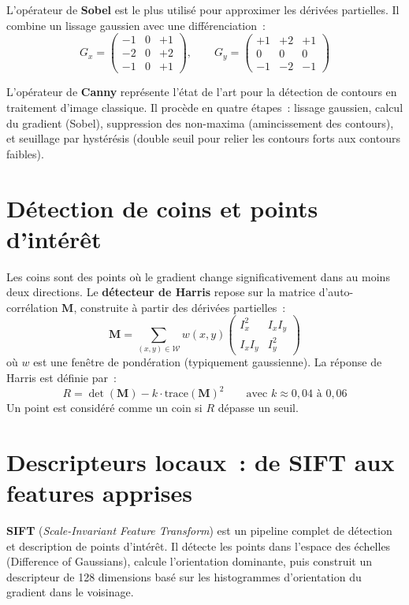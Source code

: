 \documentclass[a4paper,11pt,twoside]{book}
\newcommand{\mat}[1]{\mathbf{#1}}
\begin{document}
L'opérateur de \textbf{Sobel} est le plus utilisé pour approximer les dérivées partielles. Il combine un lissage gaussien avec une différenciation~:
\[
G_x = \begin{pmatrix} -1 & 0 & +1 \\ -2 & 0 & +2 \\ -1 & 0 & +1 \end{pmatrix}, \qquad
G_y = \begin{pmatrix} +1 & +2 & +1 \\ 0 & 0 & 0 \\ -1 & -2 & -1 \end{pmatrix}
\]

L'opérateur de \textbf{Canny} représente l'état de l'art pour la détection de contours en traitement d'image classique. Il procède en quatre étapes~: lissage gaussien, calcul du gradient (Sobel), suppression des non-maxima (amincissement des contours), et seuillage par hystérésis (double seuil pour relier les contours forts aux contours faibles).

\section{Détection de coins et points d'intérêt}

Les coins sont des points où le gradient change significativement dans au moins deux directions. Le \textbf{détecteur de Harris} repose sur la matrice d'auto-corrélation $\mat{M}$, construite à partir des dérivées partielles~:
\[
\mat{M} = \sum_{(x,y) \in \mathcal{W}} w(x,y) \begin{pmatrix} I_x^2 & I_x I_y \\ I_x I_y & I_y^2 \end{pmatrix}
\]
où $w$ est une fenêtre de pondération (typiquement gaussienne). La réponse de Harris est définie par~:
\[
R = \det(\mat{M}) - k \cdot \mathrm{trace}(\mat{M})^2 \qquad \text{avec } k \approx 0{,}04 \text{ à } 0{,}06
\]
Un point est considéré comme un coin si $R$ dépasse un seuil.

\section{Descripteurs locaux~: de SIFT aux features apprises}

\textbf{SIFT} (\textit{Scale-Invariant Feature Transform}) est un pipeline complet de détection et description de points d'intérêt. Il détecte les points dans l'espace des échelles (Difference of Gaussians), calcule l'orientation dominante, puis construit un descripteur de 128 dimensions basé sur les histogrammes d'orientation du gradient dans le voisinage.
\end{document}
